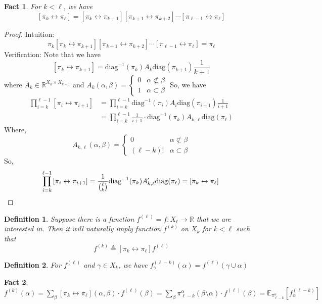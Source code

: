\documentclass{article}
\newtheorem{define}{Definition}[section]
\newtheorem{fact}{Fact}[section]
\def\Op#1#2{\left[#1 \leftrightarrow #2\right]}
\begin{document}
\begin{fact}
  For $k < \ell$, we have
  \[\Op{\pi_k}{\pi_\ell} = \Op{\pi_k}{\pi_{k+1}}\Op{\pi_{k+1}}{\pi_{k+2}}\cdots\Op{\pi_{\ell-1}}{\pi_\ell}\]
\end{fact}
\begin{proof}
  Intuition:
  \[\pi_k\Op{\pi_k}{\pi_{k+1}}\Op{\pi_{k+1}}{\pi_{k+2}}\cdots\Op{\pi_{\ell-1}}{\pi_\ell} = \pi_\ell\]
  Verification:
  Note that we have
  \[\Op{\pi_k}{\pi_{k+1}} = \mathrm{diag}^{-1}(\pi_k) A_k \mathrm{diag}(\pi_{k+1}) \frac{1}{k+1}\]
  where $A_k \in \mathbb{R}^{X_k\times X_{k+1}}$ and
  $A_k(\alpha, \beta) = \left\{
    \begin{array}{ll}
      0 & \alpha \not\subset \beta \\
      1 & \alpha \subset \beta
    \end{array}
  \right.$
  So, we have
  \begin{align*}
    \prod_{i=k}^{\ell-1}\Op{\pi_i}{\pi_{i+1}} 
    &= \prod_{i=k}^{\ell-1}\mathrm{diag}^{-1}(\pi_i)A_i\mathrm{diag}(\pi_{i+1})\frac{1}{i+1}\\
    &= \prod_{i=k}^{\ell-1}\frac{1}{i+1} \cdot \mathrm{diag}^{-1}(\pi_k) A_{k,\ell} \mathrm{diag}(\pi_\ell)
  \end{align*}
  Where, 
  \[A_{k,\ell}(\alpha, \beta) = \left\{
    \begin{array}{ll}
      0 & \alpha\not\subset\beta \\
      (\ell - k)! & \alpha \subset\beta
    \end{array}
  \right.\]
  So, 
  \[\prod_{i=k}^{\ell-1}\Op{\pi_i}{\pi_{i+1}} = \frac{1}{\binom{\ell}{k}} \mathrm{diag}^{-1}(\pi_k) A'_{k,\ell} \mathrm{diag}(\pi_\ell) = \Op{\pi_k}{\pi_\ell} \qedhere\]
\end{proof}

\begin{define}
  Suppose there is a function $f^{(\ell)} = f : X_\ell \to \mathbb{R}$ that we are interested in. Then it will naturally imply function $f^{(k)}$ on $X_k$ for $k < \ell$ such that
  \[f^{(k)} \triangleq \Op{\pi_k}{\pi_\ell}f^{(\ell)}\]
\end{define}

\begin{define}
  For $f^{(\ell)}$ and $\gamma\in X_k$, we have $f^{(\ell-k)}_\gamma(\alpha) = f^{(\ell)}(\gamma\cup\alpha)$
\end{define}

\begin{fact}
  $f^{(k)}(\alpha) = \sum_{\beta} \Op{\pi_k}{\pi_\ell}(\alpha, \beta) \cdot f^{(\ell)}(\beta) = \sum_\beta \pi^\alpha_{\ell-k}(\beta\setminus\alpha) \cdot f^{(\ell)}(\beta) = \mathbb{E}_{\pi^\alpha_{\ell-k}}[f_\alpha^{(\ell-k)}]$
\end{fact}
\end{document}
